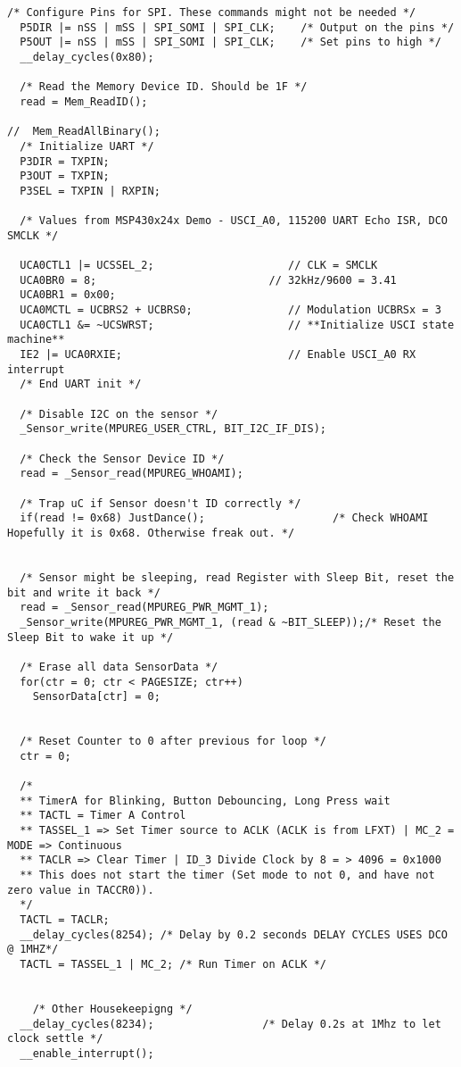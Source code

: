 \begin{lstlisting}[caption=Main.c,label=Code4]
  /* Configure Pins for SPI. These commands might not be needed */
  P5DIR |= nSS | mSS | SPI_SOMI | SPI_CLK;    /* Output on the pins */      
  P5OUT |= nSS | mSS | SPI_SOMI | SPI_CLK;    /* Set pins to high */
  __delay_cycles(0x80);
  
  /* Read the Memory Device ID. Should be 1F */
  read = Mem_ReadID();

//  Mem_ReadAllBinary();
  /* Initialize UART */
  P3DIR = TXPIN;
  P3OUT = TXPIN;
  P3SEL = TXPIN | RXPIN;

  /* Values from MSP430x24x Demo - USCI_A0, 115200 UART Echo ISR, DCO SMCLK */
  
  UCA0CTL1 |= UCSSEL_2;                     // CLK = SMCLK
  UCA0BR0 = 8;                           // 32kHz/9600 = 3.41
  UCA0BR1 = 0x00;
  UCA0MCTL = UCBRS2 + UCBRS0;               // Modulation UCBRSx = 3
  UCA0CTL1 &= ~UCSWRST;                     // **Initialize USCI state machine**
  IE2 |= UCA0RXIE;                          // Enable USCI_A0 RX interrupt
  /* End UART init */

  /* Disable I2C on the sensor */
  _Sensor_write(MPUREG_USER_CTRL, BIT_I2C_IF_DIS);
  
  /* Check the Sensor Device ID */
  read = _Sensor_read(MPUREG_WHOAMI);

  /* Trap uC if Sensor doesn't ID correctly */
  if(read != 0x68) JustDance();                    /* Check WHOAMI Hopefully it is 0x68. Otherwise freak out. */

 
  /* Sensor might be sleeping, read Register with Sleep Bit, reset the bit and write it back */
  read = _Sensor_read(MPUREG_PWR_MGMT_1);
  _Sensor_write(MPUREG_PWR_MGMT_1, (read & ~BIT_SLEEP));/* Reset the Sleep Bit to wake it up */
  
  /* Erase all data SensorData */
  for(ctr = 0; ctr < PAGESIZE; ctr++)
    SensorData[ctr] = 0;

  
  /* Reset Counter to 0 after previous for loop */
  ctr = 0;
  
  /* 
  ** TimerA for Blinking, Button Debouncing, Long Press wait 
  ** TACTL = Timer A Control
  ** TASSEL_1 => Set Timer source to ACLK (ACLK is from LFXT) | MC_2 = MODE => Continuous
  ** TACLR => Clear Timer | ID_3 Divide Clock by 8 = > 4096 = 0x1000
  ** This does not start the timer (Set mode to not 0, and have not zero value in TACCR0)).
  */
  TACTL = TACLR;
  __delay_cycles(8254); /* Delay by 0.2 seconds DELAY CYCLES USES DCO @ 1MHZ*/
  TACTL = TASSEL_1 | MC_2; /* Run Timer on ACLK */

  
    /* Other Housekeepigng */
  __delay_cycles(8234);                 /* Delay 0.2s at 1Mhz to let clock settle */
  __enable_interrupt();


\end{lstlisting}
